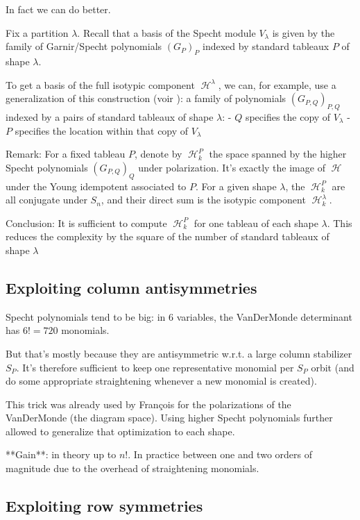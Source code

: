 \documentclass[letter,12pt]{article}
\DeclareMathOperator{\harmonics}{\mathcal{H}}
\begin{document}
	In fact we can do better.
	
	Fix a partition $\lambda$. Recall that a basis of the Specht module $V_\lambda$ is given by the family of Garnir/Specht polynomials $(G_{P})_P$ indexed by standard tableaux $P$ of shape $\lambda$.
	
	To get a basis of the full isotypic component $\harmonics^\lambda$, we can, for example, use a generalization of this construction (voir \cite{Ariki1997}): a family of polynomials $(G_{P,Q})_{P,Q}$ indexed by a pairs of standard tableaux of shape $\lambda$:
	- $Q$ specifies the copy of $V_\lambda$
	- $P$ specifies the location within that copy of $V_\lambda$
	
	
	Remark: For a fixed tableau $P$, denote by $\harmonics_k^P$ the space spanned by the higher Specht polynomials $(G_{P,Q})_Q$ under polarization. It's exactly the image of $\harmonics$ under the Young idempotent associated to $P$. For a given shape $\lambda$, the $\harmonics_k^P$ are all conjugate under $S_n$, and their direct sum is the isotypic component $\harmonics_k^\lambda$.
	
	Conclusion: It is sufficient to compute $\harmonics_k^P$ for one tableau of each shape $\lambda$. This reduces the complexity by the square of the number of standard tableaux of shape $\lambda$
	
	\subsection{Exploiting column antisymmetries}
	
	Specht polynomials tend to be big: in $6$ variables, the VanDerMonde determinant has $6!=720$ monomials.
	
	But that's mostly because they are antisymmetric w.r.t. a large column stabilizer $S_P$. It's therefore sufficient to keep one representative monomial per $S_P$ orbit (and do some appropriate straightening whenever a new monomial is created). 
	
	This trick was already used by François for the polarizations of the VanDerMonde (the diagram space). Using higher Specht polynomials further allowed  to generalize that optimization to each shape.
	
	**Gain**: in theory up to $n!$. In practice between one and two orders of magnitude due to the overhead of straightening monomials.
	
	\subsection{Exploiting row symmetries}
	
\end{document}
